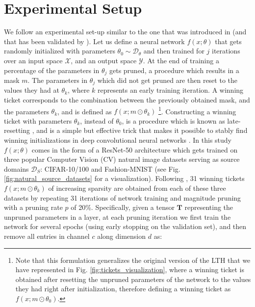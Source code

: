 \section{Experimental Setup}
\label{sec:experimental_setup}
We follow an experimental set-up similar to the one that was introduced in \cite{morcos2019one} (and that has been validated by \citet{gohil2019one}).
Let us define a neural network $f(x;\theta)$ that gets randomly initialized with parameters $\theta_0 \sim \mathscr{D}_{\theta}$ and then trained for $j$ iterations
over an input space $\mathcal{X}$, and an output space $\mathcal{Y}$. 
At the end of training a percentage of the parameters in $\theta_j$ gets pruned, a procedure which results in a mask $m$. The parameters in $\theta_j$ which did not get pruned are then reset to the values they had at $\theta_k$, where $k$ represents an early training iteration. A winning ticket corresponds to the combination between the previously obtained mask, and the parameters $\theta_k$, and is defined as $f(x;m\odot\theta_k)$ \footnote{Note that this formulation generalizes the original version of the LTH \cite{frankle2018lottery} that we have represented in Fig. \ref{fig:tickets_visualization}, where a winning ticket is obtained after resetting the unpruned parameters of the network to the values they had right after initialization, therefore defining a winning ticket as $f(x;m\odot\theta_0)$.}. Constructing a winning ticket with parameters $\theta_k$, instead of $\theta_0$, is a procedure which is known as late-resetting \cite{franklestabilizing}, and is a simple but effective trick that makes it possible to stably find winning initializations in deep convolutional neural networks \cite{franklestabilizing,morcos2019one}. In this study $f(x;\theta)$ comes in the form of a ResNet-50 architecture \cite{han2015deep} which gets trained on three popular Computer Vision (CV) natural image datasets serving as source domains $\mathcal{D}_S$: CIFAR-10/100 and Fashion-MNIST (see Fig. \ref{fig:natural_source_datasets} for a visualization). Following \cite{han2015deep,morcos2019one}, 31 winning tickets $f(x;m\odot\theta_k)$ of increasing sparsity are obtained from each of these three datasets by repeating 31 iterations of network training and magnitude pruning with a pruning rate $p$ of 20\%. Specifically, given a tensor $\mathbf{T}$ representing the unpruned parameters in a layer, at each pruning iteration we first train the network for several epochs (using early stopping on the validation set), and then remove all entries in channel $c$ along dimension $d$ as:
